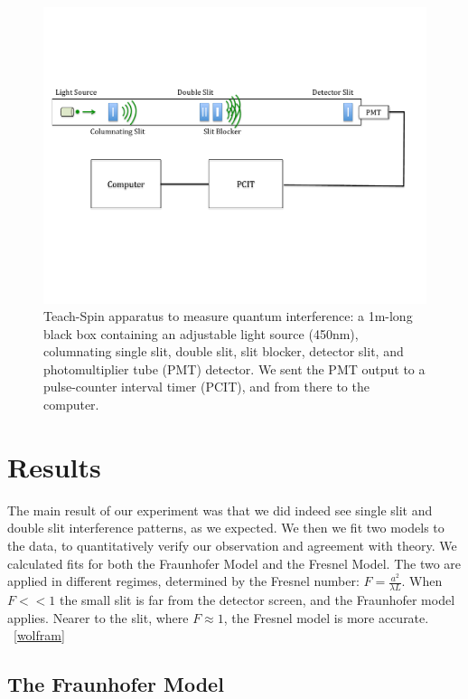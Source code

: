 \documentclass[prb,preprint]{revtex4-1}
\begin{document}
\begin{figure}[h!]
\centering
\includegraphics[width=6in]{set-up.pdf}
\caption{Teach-Spin apparatus to measure quantum interference: a 1m-long black box containing an adjustable light source (450nm), columnating single slit, double slit, slit blocker, detector slit, and photomultiplier tube (PMT) detector. We sent the PMT output to a pulse-counter interval timer (PCIT), and from there to the computer.}
\label{set-up}
\end{figure}





\section{Results}

The main result of our experiment was that we did indeed see single slit and double slit interference patterns, as we expected.  We then we fit two models to the data, to quantitatively verify our observation and agreement with theory.  We calculated fits for both the Fraunhofer Model and the Fresnel Model.  The two are applied in different regimes, determined by the Fresnel number: $F = \frac{a^2}{\lambda L}$.  When $F << 1$ the small slit is far from the detector screen, and the Fraunhofer model applies.  Nearer to the slit, where $F \approx 1$, the Fresnel model is more accurate. ~\ref{wolfram}

\subsection{The Fraunhofer Model}
\end{document}

